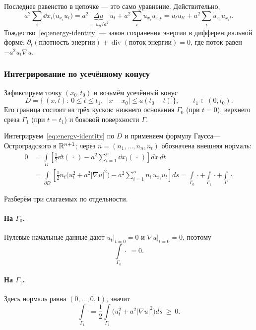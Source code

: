 \begin{idea}
Последнее равенство в цепочке — это само уравнение. Действительно,
\[
  a^2 \sum_i \dd{}{x_i}\big(u_{x_i} u_t\big)
  = a^2 \underbrace{\Delta u}_{=\,u_{tt}/a^2}\, u_t
    + a^2 \sum_i u_{x_i} u_{x_i t}
  = u_t u_{tt} + a^2 \sum_i u_{x_i} u_{x_i t} .
\]
Тождество~\eqref{eq:energy-identity} — закон сохранения энергии в
дифференциальной форме: $\partial_t(\text{плотность энергии}) +
\operatorname{div}(\text{поток энергии}) = 0$, где поток равен
$-a^2 u_t \nabla u$.
\end{idea}

\subsubsection*{Интегрирование по усечённому конусу}

Зафиксируем точку $(x_0,t_0)$ и возьмём усечённый конус
\[
  D = \big\{\, (x,t) : \ 0 \le t \le t_1, \ \ |x - x_0| \le a(t_0 - t) \,\big\},
  \qquad t_1 \in (0, t_0) .
\]
Его граница состоит из трёх кусков: нижнего основания $\Gamma_0$ (при $t=0$),
верхнего среза $\Gamma_1$ (при $t = t_1$) и боковой поверхности $\Gamma$.


Интегрируем~\eqref{eq:energy-identity} по $D$ и применяем формулу
Гаусса—Остроградского в $\mathbb{R}^{n+1}$; через $n = (n_1,\dots,n_n, n_t)$ обозначена
внешняя нормаль:
\begin{align*}
  0 &= \int\limits_D \left[\frac12 \dd{}{t}(\,\cdot\,)
       - a^2 \sum_{i=1}^{n} \dd{}{x_i}(\,\cdot\,)\right] dx\, dt \\[4pt]
    &= \int\limits_{\partial D} \left[\frac12 n_t
       \Big(u_t^2 + a^2 |\nabla u|^2\Big)
       - a^2 \sum_{i=1}^{n} n_i\, u_{x_i} u_t \right] ds
     = \int\limits_{\Gamma_0} \cdot
     + \int\limits_{\Gamma_1} \cdot
     + \int\limits_{\Gamma} \cdot
\end{align*}

Разберём три слагаемых по отдельности.

\paragraph{На $\Gamma_0$.} Нулевые начальные данные дают $u_t|_{t=0} = 0$ и
$\nabla u|_{t=0} = 0$, поэтому
\[
  \int\limits_{\Gamma_0} \cdot \ = 0 .
\]

\paragraph{На $\Gamma_1$.} Здесь нормаль равна $(0,\dots,0,1)$, значит
\[
  \int\limits_{\Gamma_1} \cdot
  = \frac12 \int\limits_{\Gamma_1} \Big(u_t^2 + a^2 |\nabla u|^2\Big) ds
  \ \ge\ 0 .
\]


